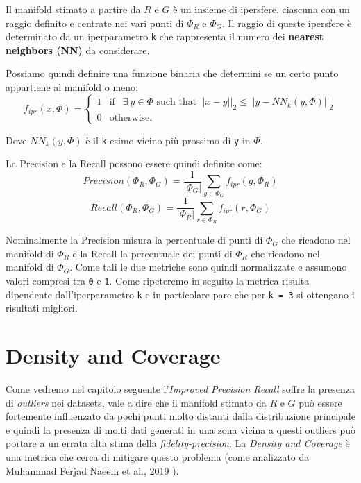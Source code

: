Il manifold stimato a partire da \(R\) e \(G\) è un insieme di ipersfere, ciascuna con un raggio definito e centrate nei vari punti di \(\Phi_R\) e \(\Phi_G\). Il raggio di queste ipersfere è 
determinato da un iperparametro \texttt{k} che rappresenta il numero dei \textbf{nearest neighbors (NN)} da considerare. 

Possiamo quindi definire una funzione binaria che determini se un certo punto appartiene al manifold o meno:
\begin{equation}
    f_{ipr}(x, \Phi) = 
    \begin{cases}
        1 & \text{if }~~ \exists ~ y \in \Phi \text{ such that } ||x - y||_2 \leq ||y - NN_k(y, \Phi)||_2 \\
        0 & \text{otherwise.}
    \end{cases}
\end{equation}

Dove \(NN_k(y, \Phi)\) è il \texttt{k}-esimo vicino più prossimo di \texttt{y} in \(\Phi\).

La Precision e la Recall possono essere quindi definite come:
\begin{equation}
    Precision(\Phi_R, \Phi_G) = \frac{1}{|\Phi_G|} \sum_{g \in \Phi_G} f_{ipr}(g, \Phi_R)
\end{equation}
\begin{equation}
    Recall(\Phi_R, \Phi_G) = \frac{1}{|\Phi_R|} \sum_{r \in \Phi_R} f_{ipr}(r, \Phi_G)
\end{equation}

Nominalmente la Precision misura la percentuale di punti di \(\Phi_G\) che ricadono nel manifold di \(\Phi_R\) e la Recall la percentuale dei punti di \(\Phi_R\) che ricadono nel manifold di \(\Phi_G\).
Come tali le due metriche sono quindi normalizzate e assumono valori compresi tra \texttt{0} e \texttt{1}.
Come ripeteremo in seguito la metrica risulta dipendente dall'iperparametro \texttt{k} e in particolare pare che per \texttt{k = 3} si ottengano i risultati migliori.

\section{Density and Coverage}
\label{sec:density-and-coverage}

Come vedremo nel capitolo seguente l'\textit{Improved Precision Recall} soffre la presenza di \textit{outliers} nei datasets, vale a dire che il manifold stimato da \(R\) e \(G\) può essere fortemente influenzato da pochi punti molto distanti dalla distribuzione principale e quindi la presenza di molti dati generati in una zona vicina a questi outliers può portare a un errata alta stima della \textit{fidelity-precision}.
La \textit{Density and Coverage} è una metrica che cerca di mitigare questo problema (come analizzato da Muhammad Ferjad Naeem et al., 2019 \cite{3ReliableFidelityDiversityMetrics}). 

